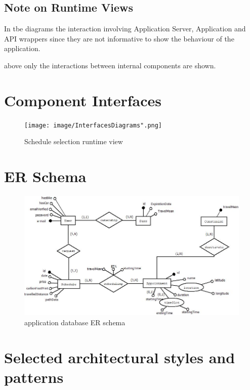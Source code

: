\subsection{Note on Runtime Views}
In tbe diagrams the interaction involving Application Server, Application and API wrappers since they are not informative to show the behaviour of the application.

above only the interactions between internal components are shown.

\section{Component Interfaces}
\begin{figure}[H]
\begin{center}
\texttt{[image: image/InterfacesDiagrams".png]}
\caption{Schedule selection runtime view}
\end{center}
\end{figure}

\section{ER Schema}
\begin{figure}[H]
\begin{center}
\includegraphics[width=580pt, keepaspectratio, angle=90,origin=c]{image/SchemaER/ER_DD.jpeg}
\caption{application database ER schema}
\end{center}
\end{figure}

\section{Selected architectural styles and patterns}

